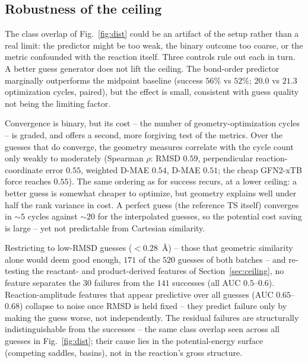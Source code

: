 \documentclass[11pt]{article}
\begin{document}
\subsection{Robustness of the ceiling}
The class overlap of Fig.~\ref{fig:dist} could be an artifact of the setup rather
than a real limit: the predictor might be too weak, the binary outcome too coarse,
or the metric confounded with the reaction itself. Three controls rule out each in
turn.
A better guess generator does not lift the ceiling. The bond-order predictor
marginally outperforms the midpoint baseline (success $56\%$ vs $52\%$; $20.0$ vs
$21.3$ optimization cycles, paired), but the effect is small, consistent with
guess quality not being the limiting factor.

Convergence is binary, but its cost -- the number of geometry-optimization
cycles -- is graded, and offers a second, more forgiving test of the metrics.
Over the guesses that do converge, the geometry measures correlate with the cycle
count only weakly to moderately (Spearman $\rho$: RMSD $0.59$, perpendicular
reaction-coordinate error $0.55$, weighted D-MAE $0.54$, D-MAE $0.51$; the cheap
GFN2-xTB force reaches $0.55$). The same ordering as for success recurs, at a
lower ceiling: a better guess is somewhat cheaper to optimize, but geometry
explains well under half the rank variance in cost. A perfect guess (the reference
TS itself) converges in $\sim 5$ cycles against $\sim 20$ for the interpolated
guesses, so the potential cost saving is large -- yet not predictable from
Cartesian similarity.

Restricting to low-RMSD guesses ($<0.28$~\AA) -- those that geometric similarity
alone would deem good enough, $171$ of the $520$ guesses of both batches -- and
re-testing the reactant- and product-derived features of
Section~\ref{sec:ceiling}, no feature separates the $30$ failures from the $141$
successes (all AUC $0.5$--$0.6$).
Reaction-amplitude features that appear predictive over all guesses (AUC
$0.65$--$0.68$) collapse to noise once RMSD is held fixed -- they predict failure
only by making the guess worse, not independently. The residual failures are
structurally indistinguishable from the successes -- the same class overlap seen
across all guesses in Fig.~\ref{fig:dist}; their cause lies in the
potential-energy surface (competing saddles, basins), not in the reaction's gross
structure.
\end{document}
